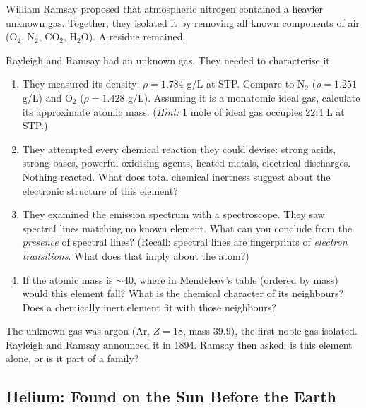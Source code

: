 \documentclass[12pt, a4paper]{book}
\begin{document}
William Ramsay proposed that atmospheric nitrogen contained
a heavier unknown gas.
Together, they isolated it by removing all known components
of air (O$_2$, N$_2$, CO$_2$, H$_2$O).
A residue remained.

\begin{puzzlebox}
Rayleigh and Ramsay had an unknown gas.
They needed to characterise it.

\begin{enumerate}[label=(\alph*), leftmargin=*]
  \item They measured its density: $\rho = 1.784$ g/L at STP.
        Compare to N$_2$ ($\rho = 1.251$ g/L) and O$_2$
        ($\rho = 1.428$ g/L).
        Assuming it is a monatomic ideal gas, calculate
        its approximate atomic mass.
        (\textit{Hint:} 1 mole of ideal gas occupies 22.4 L at STP.)

  \item They attempted every chemical reaction they could
        devise: strong acids, strong bases, powerful oxidising
        agents, heated metals, electrical discharges.
        Nothing reacted.
        What does total chemical inertness suggest about
        the electronic structure of this element?

  \item They examined the emission spectrum with a spectroscope.
        They saw spectral lines matching no known element.
        What can you conclude from the \emph{presence}
        of spectral lines? (Recall: spectral lines are
        fingerprints of \emph{electron transitions}.
        What does that imply about the atom?)

  \item If the atomic mass is $\sim 40$, where in Mendeleev's
        table (ordered by mass) would this element fall?
        What is the chemical character of its neighbours?
        Does a chemically inert element fit with those neighbours?
\end{enumerate}
\end{puzzlebox}

The unknown gas was argon (Ar, $Z=18$, mass 39.9),
the first noble gas isolated.
Rayleigh and Ramsay announced it in 1894.
Ramsay then asked: is this element alone, or is it
part of a family?

\subsection{Helium: Found on the Sun Before the Earth}
\end{document}
